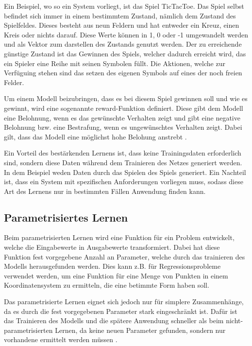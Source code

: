 Ein Beispiel, wo so ein System vorliegt, ist das Spiel TicTacToe. Das Spiel selbst befindet sich immer in einem bestimmtem Zustand, nämlich dem Zustand des Spielfeldes. Dieses besteht aus neun Feldern und hat entweder ein Kreuz, einen Kreis oder nichts darauf. Diese Werte können in 1, 0 oder -1 umgewandelt werden und als Vektor zum darstellen des Zustands genutzt werden. Der zu erreichende günstige Zustand ist das Gewinnen des Spiels, welcher dadurch erreicht wird, das ein Spieler eine Reihe mit seinen Symbolen füllt. Die Aktionen, welche zur Verfüguing stehen sind das setzen des eigenen Symbols auf eines der noch freien Felder.

Um einem Modell beizubringen, dass es bei diesem Spiel gewinnen soll und wie es gewinnt, wird eine sogenannte reward-Funktion definiert. Diese gibt dem Modell eine Belohnung, wenn es das gewünschte Verhalten zeigt und gibt eine negative Belohnung bzw. eine Bestrafung, wenn es ungewünschtes Verhalten zeigt. Dabei gilt, dass das Modell eine möglichst hohe Belohung anstrebt \cite[vgl.][S. 255ff.]{StatMaschLernen}.

Ein Vorteil des bestärkenden Lernens ist, dass keine Trainingsdaten erforderlich sind, sondern diese Daten während dem Trainieren des Netzes generiert werden. In dem Beispiel weden Daten durch das Spielen des Spiels generiert. Ein Nachteil ist, dass ein System mit spezifischen Anforderungen vorliegen muss, sodass diese Art des Lernens nur in bestimmten Fällen Anwendung finden kann.

\subsection{Parametrisiertes Lernen}
\label{parametrisiertesLernen}
Beim parametrisierten Lernen wird eine Funktion für ein Problem entwickelt, welche die Eingabewerte in Ausgabewerte transformiert. Dabei hat diese Funktion fest vorgegebene Anzahl an Parameter, welche durch das trainieren des Modells herausgefunden werden. Dies kann z.B. für Regressionsprobleme verwendet werden, um eine Funktion für eine Menge von Punkten in einem Koordinatensystem zu ermitteln, die eine betimmte Form haben soll.

Das parametrisierte Lernen eignet sich jedoch nur für simplere Zusammenhänge, da es durch die fest vorgegebenen Parameter stark eingeschränkt ist. Dafür ist das Trainieren des Modells und die spätere Anwendung schneller als beim nicht-parametrisierten Lernen, da keine neuen Parameter gefunden, sondern nur vorhandene ermittelt werden müssen \cite[vgl.][]{paraNichtPara}.

